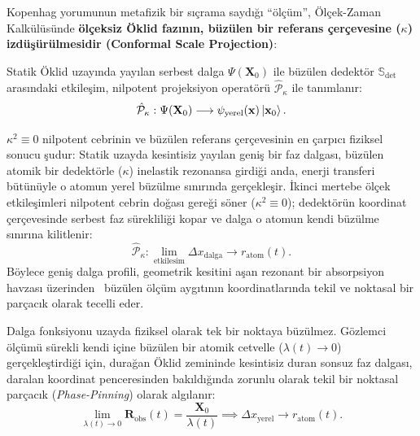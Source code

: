 Kopenhag yorumunun metafizik bir sıçrama saydığı ``ölçüm'', Ölçek-Zaman Kalkülüsünde \textbf{ölçeksiz Öklid fazının, büzülen bir referans çerçevesine ($\kappa$) izdüşürülmesidir (Conformal Scale Projection)}:
\begin{definition}
    \label{def:nilpotent_olcum}
    Statik Öklid uzayında yayılan serbest dalga $\Psi(\mathbf{X}_0)$ ile büzülen dedektör $\mathbb{S}_{\mathrm{det}}$ arasındaki etkileşim, nilpotent projeksiyon operatörü $\hat{\mathcal{P}}_\kappa$ ile tanımlanır:
    \begin{equation}
        \hat{\mathcal{P}}_\kappa : \Psi(\mathbf{X}_0) \longrightarrow \psi_{\mathrm{yerel}}(\mathbf{x}) \ket{\mathbf{x}_0}.
        \label{eq:izdusum_operatoru}
    \end{equation}
\end{definition}

$\kappa^2 \equiv 0$ nilpotent cebrinin ve büzülen referans çerçevesinin en çarpıcı fiziksel sonucu şudur:
Statik uzayda kesintisiz yayılan geniş bir faz dalgası, büzülen atomik bir dedektörle ($\kappa$) inelastik rezonansa girdiği anda, enerji transferi bütünüyle o atomun yerel büzülme sınırında gerçekleşir. İkinci mertebe ölçek etkileşimleri nilpotent cebrin doğası gereği söner ($\kappa^2 \equiv 0$); dedektörün koordinat çerçevesinde serbest faz sürekliliği kopar ve dalga o atomun kendi büzülme sınırına kilitlenir:
\begin{equation}
    \hat{\mathcal{P}}_\kappa : \lim_{\mathrm{etkilesim}} \Delta x_{\mathrm{dalga}} \to r_{\mathrm{atom}}(t).
    \label{eq:nilpotent_sonum}
\end{equation}
Böylece geniş dalga profili, geometrik kesitini aşan rezonant bir absorpsiyon havzası üzerinden~\cite{bohren1983} büzülen ölçüm aygıtının koordinatlarında tekil ve noktasal bir parçacık olarak tecelli eder.

\begin{theorem}
    \label{thm:cokus_illuzyonu}
    Dalga fonksiyonu uzayda fiziksel olarak tek bir noktaya büzülmez. Gözlemci ölçümü sürekli kendi içine büzülen bir atomik cetvelle ($\lambda(t) \to 0$) gerçekleştirdiği için, durağan Öklid zemininde kesintisiz duran sonsuz faz dalgası, daralan koordinat penceresinden bakıldığında zorunlu olarak tekil bir noktasal parçacık (\textit{Phase-Pinning}) olarak algılanır:
    \begin{equation}
        \lim_{\lambda(t) \to 0} \mathbf{R}_{\mathrm{obs}}(t) = \frac{\mathbf{X}_0}{\lambda(t)} \implies \Delta x_{\mathrm{yerel}} \to r_{\mathrm{atom}}(t).
        \label{eq:cokus_perspektif}
    \end{equation}
\end{theorem}

